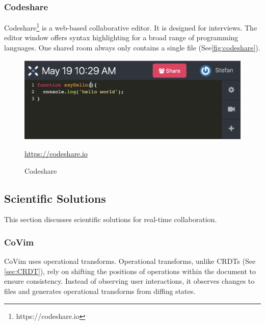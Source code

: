\subsubsection{Codeshare}
Codeshare\footnote{https://codeshare.io} is a web-based collaborative editor. It is designed for interviews. The editor window offers syntax highlighting for a broad range of programming languages. One shared room always only contains a single file (See\autoref{fig:codeshare}).
\begin{figure}[h]
    \centering
    \includegraphics[width=1\linewidth]{figures/screenshots/codeshare.png}
	\caption{Codeshare}
	\href{https://codeshare.io}{https://codeshare.io}
    \label{fig:codeshare}
\end{figure}


\subsection{Scientific Solutions}

This section discusses scientific solutions for real-time collaboration.

\subsubsection{CoVim}
CoVim \cite{ChoNgSun:2017:CoVim:Incorporatingreal-timecollaborationcapabilitiesintocomprehensivetexteditors} uses operational transforms. Operational transforms, unlike CRDTs (See \autoref{sec:CRDT}), rely on shifting the positions of operations within the document to ensure consistency. Instead of observing user interactions, it observes changes to files and generates operational transforms from diffing states.

